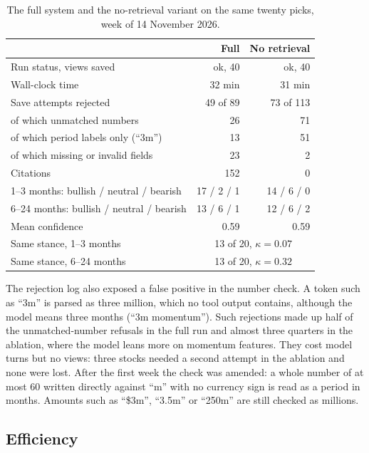 \documentclass[preprint,11pt]{elsarticle}
\begin{document}
\begin{table}[t]
\centering\small
\caption{The full system and the no-retrieval variant on the same twenty picks, week of 14 November 2026.}
\label{tab:ablation}
\begin{tabular}{@{}lrr@{}}
\toprule
 & Full & No retrieval \\
\midrule
Run status, views saved & ok, 40 & ok, 40 \\
Wall-clock time & 32 min & 31 min \\
Save attempts rejected & 49 of 89 & 73 of 113 \\
\quad of which unmatched numbers & 26 & 71 \\
\quad of which period labels only (``3m'') & 13 & 51 \\
\quad of which missing or invalid fields & 23 & 2 \\
Citations & 152 & 0 \\
1--3 months: bullish / neutral / bearish & 17 / 2 / 1 & 14 / 6 / 0 \\
6--24 months: bullish / neutral / bearish & 13 / 6 / 1 & 12 / 6 / 2 \\
Mean confidence & 0.59 & 0.59 \\
\midrule
Same stance, 1--3 months & \multicolumn{2}{c}{13 of 20, $\kappa = 0.07$} \\
Same stance, 6--24 months & \multicolumn{2}{c}{13 of 20, $\kappa = 0.32$} \\
\bottomrule
\end{tabular}
\end{table}

The rejection log also exposed a false positive in the number check. A token such as ``3m'' is parsed as
three million, which no tool output contains, although the model means three months (``3m momentum'').
Such rejections made up half of the unmatched-number refusals in the full run and almost three quarters in
the ablation, where the model leans more on momentum features. They cost model turns but no views: three
stocks needed a second attempt in the ablation and none were lost. After the first week the check was
amended: a whole number of at most 60 written directly against ``m'' with no currency sign is read as a
period in months. Amounts such as ``\$3m'', ``3.5m'' or ``250m'' are still checked as millions.

\subsection{Efficiency}
\end{document}
